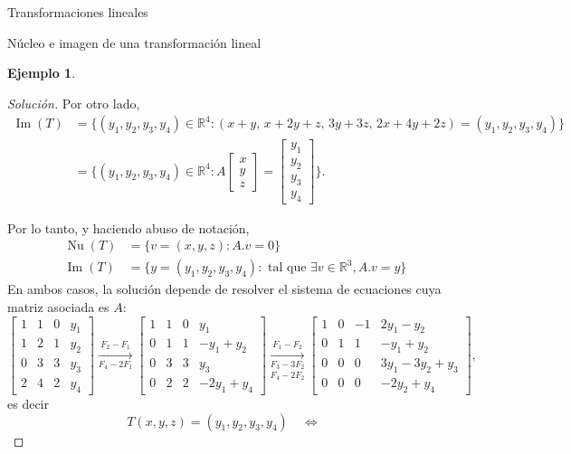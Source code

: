 \documentclass[a4paper,12pt,twoside,spanish]{amsbook}
\theoremstyle{definition}
\newtheorem{ejemplo}{Ejemplo}[section]
\theoremstyle{remark}
\newcommand{\img}{\operatorname{Im}}
\newcommand{\nuc}{\operatorname{Nu}}
\newcommand{\R}{\mathbb R}
\begin{document}
\begin{chapter}{Transformaciones lineales}
\begin{section}{Núcleo e imagen de una transformación lineal}
\begin{ejemplo}
\begin{proof}[Solución]
		Por  otro lado,
		\begin{align*}
		\img(T) &= \{(y_1,y_2,y_3,y_4)\in \R^4: (x +y ,\,x +2y +z,\,3y +3z,\,2x +4y +2z) =(y_1,y_2,y_3,y_4)\}\\
		&=  \{(y_1,y_2,y_3,y_4)\in \R^4: A\begin{bmatrix}x\\y\\z	\end{bmatrix}  =
		\begin{bmatrix}y_1\\y_2\\y_3\\y_4\end{bmatrix}\}.
		\end{align*}
		
		
		Por lo tanto, y haciendo abuso de notación,  
		\begin{align*}
		\nuc(T) &= \{v=(x,y,z):   A.{v}=0\}\\
		\img(T) &= \{y= (y_1,y_2,y_3,y_4): \text{ tal que } \exists v \in \R^3, A.{v} = {y}  \}
		\end{align*}
		En  ambos casos, la solución depende de resolver el sistema de ecuaciones cuya matriz asociada es $A$:
		\begin{equation*}
		\left[\begin{array}{rrr|r}1&1&0&y_1\\1&2&1&y_2\\0&3&3&y_3\\2&4&2&y_4 \end{array}\right]
		\underset{F_4-2F_1}{\stackrel{F_2 -F_1}{\longrightarrow}} 
		\left[\begin{array}{rrr|r}1&1&0&y_1\\0&1&1&-y_1+y_2\\0&3&3&y_3\\0&2&2&-2y_1 +y_4 \end{array}\right]
		\underset{F_4-2F_2}{\underset{F_3-3F_2}{\stackrel{F_1 -F_2}{\longrightarrow}} }
		\left[\begin{array}{rrr|r}1&0&-1&2y_1-y_2\\0&1&1&-y_1+y_2\\0&0&0&3y_1-3y_2+y_3\\0&0&0&-2y_2 +y_4 \end{array}\right],
		\end{equation*}
		es decir
		\begin{equation}\label{eq-gen}
		T(x,y,z) = (y_1,y_2,y_3,y_4) \quad\Leftrightarrow \quad
		\begin{array}{rl}

\end{array}
\end{equation}
\end{proof}
\end{ejemplo}
\end{section}
\end{chapter}
\end{document}
